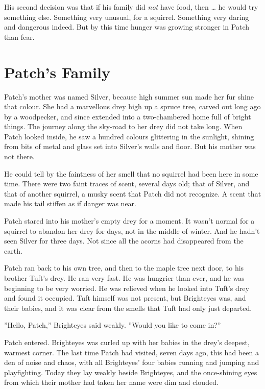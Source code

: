 \documentclass[12pt]{book}
\begin{document}
His second decision was that if his family did \textit{not} have food,
then \ldots{} he would try something else. Something very unusual, for
a squirrel. Something very daring and dangerous indeed. But by this
time hunger was growing stronger in Patch than fear.


\section{Patch's Family}

Patch's mother was named Silver, because high summer sun made her fur
shine that colour. She had a marvellous drey high up a spruce tree,
carved out long ago by a woodpecker, and since extended into a
two-chambered home full of bright things. The journey along the
sky-road to her drey did not take long. When Patch looked inside, he
saw a hundred colours glittering in the sunlight, shining from bits of
metal and glass set into Silver's walls and floor. But his mother was
not there.

He could tell by the faintness of her smell that no squirrel had been
here in some time. There were two faint traces of scent, several days
old; that of Silver, and that of another squirrel, a musky scent that
Patch did not recognize. A scent that made his tail stiffen as if
danger was near.

Patch stared into his mother's empty drey for a moment. It wasn't
normal for a squirrel to abandon her drey for days, not in the middle
of winter. And he hadn't seen Silver for three days. Not since all the
acorns had disappeared from the earth.

Patch ran back to his own tree, and then to the maple tree next door,
to his brother Tuft's drey. He ran very fast. He was hungrier than
ever, and he was beginning to be very worried. He was relieved when he
looked into Tuft's drey and found it occupied. Tuft himself was not
present, but Brighteyes was, and their babies, and it was clear from
the smells that Tuft had only just departed.

''Hello, Patch,'' Brighteyes said weakly. ''Would you like to come
in?''

Patch entered. Brighteyes was curled up with her babies in the drey's
deepest, warmest corner. The last time Patch had visited, seven days
ago, this had been a den of noise and chaos, with all Brighteyes' four
babies running and jumping and playfighting. Today they lay weakly
beside Brighteyes, and the once-shining eyes from which their mother
had taken her name were dim and clouded.
\end{document}
